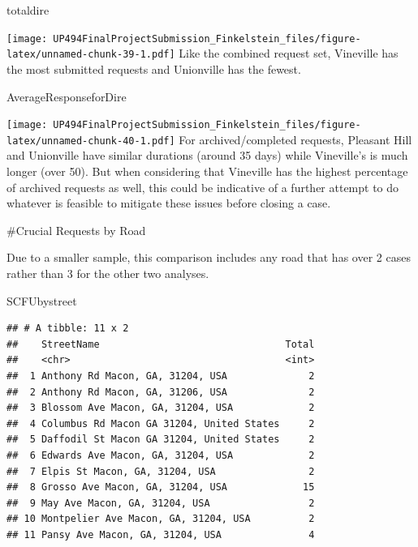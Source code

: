 \documentclass[
]{article}
\newenvironment{Shaded}{\begin{snugshade}}{\end{snugshade}}
\newcommand{\NormalTok}[1]{#1}
\begin{document}
\begin{Shaded}
\begin{Highlighting}[]
\NormalTok{totaldire}
\end{Highlighting}
\end{Shaded}

\texttt{[image: UP494FinalProjectSubmission\_Finkelstein\_files/figure-latex/unnamed-chunk-39-1.pdf]}
Like the combined request set, Vineville has the most submitted requests
and Unionville has the fewest.

\begin{Shaded}
\begin{Highlighting}[]
\NormalTok{AverageResponseforDire}
\end{Highlighting}
\end{Shaded}

\texttt{[image: UP494FinalProjectSubmission\_Finkelstein\_files/figure-latex/unnamed-chunk-40-1.pdf]}
For archived/completed requests, Pleasant Hill and Unionville have
similar durations (around 35 days) while Vineville's is much longer
(over 50). But when considering that Vineville has the highest
percentage of archived requests as well, this could be indicative of a
further attempt to do whatever is feasible to mitigate these issues
before closing a case.

\#Crucial Requests by Road

Due to a smaller sample, this comparison includes any road that has over
2 cases rather than 3 for the other two analyses.

\begin{Shaded}
\begin{Highlighting}[]
\NormalTok{SCFUbystreet}
\end{Highlighting}
\end{Shaded}

\begin{verbatim}
## # A tibble: 11 x 2
##    StreetName                                Total
##    <chr>                                     <int>
##  1 Anthony Rd Macon, GA, 31204, USA              2
##  2 Anthony Rd Macon, GA, 31206, USA              2
##  3 Blossom Ave Macon, GA, 31204, USA             2
##  4 Columbus Rd Macon GA 31204, United States     2
##  5 Daffodil St Macon GA 31204, United States     2
##  6 Edwards Ave Macon, GA, 31204, USA             2
##  7 Elpis St Macon, GA, 31204, USA                2
##  8 Grosso Ave Macon, GA, 31204, USA             15
##  9 May Ave Macon, GA, 31204, USA                 2
## 10 Montpelier Ave Macon, GA, 31204, USA          2
## 11 Pansy Ave Macon, GA, 31204, USA               4
\end{verbatim}
\end{document}
